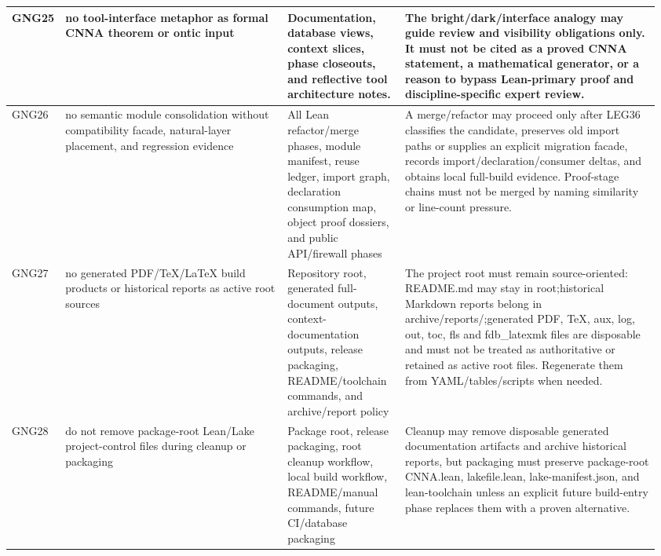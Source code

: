 \begin{longtable}{L{0.045\linewidth} L{0.345\linewidth} L{0.185\linewidth} L{0.39\linewidth}}
\hline
\addlinespace[0.24em]
GNG25 & no tool-interface metaphor as formal CNNA theorem or ontic input & Documentation, database views, context slices, phase closeouts, and reflective tool architecture notes. & The bright/\allowbreak{}dark/\allowbreak{}interface analogy may guide review and visibility obligations only. It must not be cited as a proved CNNA statement, a mathematical generator, or a reason to bypass Lean-primary proof and discipline-specific expert review.\\
\hline
\addlinespace[0.24em]
GNG26 & no semantic module consolidation without compatibility facade, natural-layer placement, and regression evidence & All Lean refactor/\allowbreak{}merge phases, module manifest, reuse ledger, import graph, declaration consumption map, object proof dossiers, and public API/\allowbreak{}firewall phases & A merge/\allowbreak{}refactor may proceed only after LEG36 classifies the candidate, preserves old import paths or supplies an explicit migration facade, records import/\allowbreak{}declaration/\allowbreak{}consumer deltas, and obtains local full-build evidence. Proof-stage chains must not be merged by naming similarity or line-count pressure.\\
\hline
\addlinespace[0.24em]
GNG27 & no generated PDF/\allowbreak{}TeX/\allowbreak{}LaTeX build products or historical reports as active root sources & Repository root, generated full-document outputs, context-documentation outputs, release packaging, README/\allowbreak{}toolchain commands, and archive/\allowbreak{}report policy & The project root must remain source-oriented: README.md may stay in root;\newline historical Markdown reports belong in archive/\allowbreak{}reports/\allowbreak{};\newline generated PDF, TeX, aux, log, out, toc, fls and fdb\_latexmk files are disposable and must not be treated as authoritative or retained as active root files. Regenerate them from YAML/\allowbreak{}tables/\allowbreak{}scripts when needed.\\
\hline
\addlinespace[0.24em]
GNG28 & do not remove package-root Lean/\allowbreak{}Lake project-control files during cleanup or packaging & Package root, release packaging, root cleanup workflow, local build workflow, README/\allowbreak{}manual commands, future CI/\allowbreak{}database packaging & Cleanup may remove disposable generated documentation artifacts and archive historical reports, but packaging must preserve package-root CNNA.lean, lakefile.lean, lake-manifest.json, and lean-toolchain unless an explicit future build-entry phase replaces them with a proven alternative.\\

\end{longtable}
